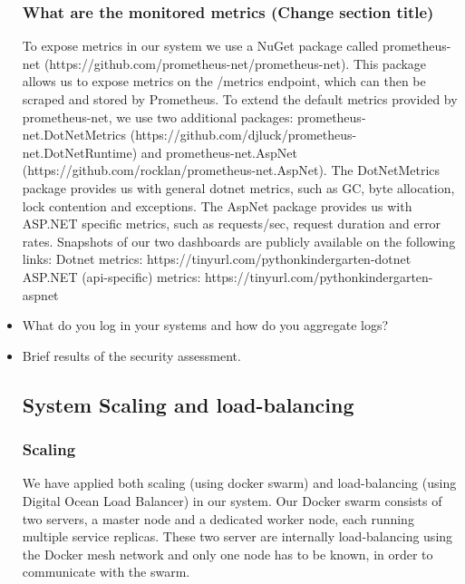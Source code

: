 \begin{itemize}
  \subsubsection{What are the monitored metrics (Change section title)}
  To expose metrics in our system we use a NuGet package called prometheus-net (https://github.com/prometheus-net/prometheus-net).
  This package allows us to expose metrics on the /metrics endpoint, which can then be scraped and stored by Prometheus.
  \newline
  To extend the default metrics provided by prometheus-net, we use two additional packages: 
  prometheus-net.DotNetMetrics (https://github.com/djluck/prometheus-net.DotNetRuntime) and prometheus-net.AspNet (https://github.com/rocklan/prometheus-net.AspNet).
  \newline
  The DotNetMetrics package provides us with general dotnet metrics, such as GC, byte allocation, lock contention and exceptions.
  \newline
  The AspNet package provides us with ASP.NET specific metrics, such as requests/sec, request duration and error rates.
  \newline
  \newline
  Snapshots of our two dashboards are publicly available on the following links:
  \newline
  Dotnet metrics: https://tinyurl.com/pythonkindergarten-dotnet
  \newline
  ASP.NET (api-specific) metrics: https://tinyurl.com/pythonkindergarten-aspnet
  \item What do you log in your systems and how do you aggregate logs?
  \item Brief results of the security assessment.
  \subsection{System Scaling and load-balancing}
  \subsubsection{Scaling}
  We have applied both scaling (using docker swarm) and load-balancing (using Digital Ocean Load Balancer) in our system. 
  Our Docker swarm consists of two servers, a master node and a dedicated worker node, each running multiple service replicas. 
  These two server are internally load-balancing using the Docker mesh network and only one node has to be known, in order to communicate with the swarm.


\end{itemize}
